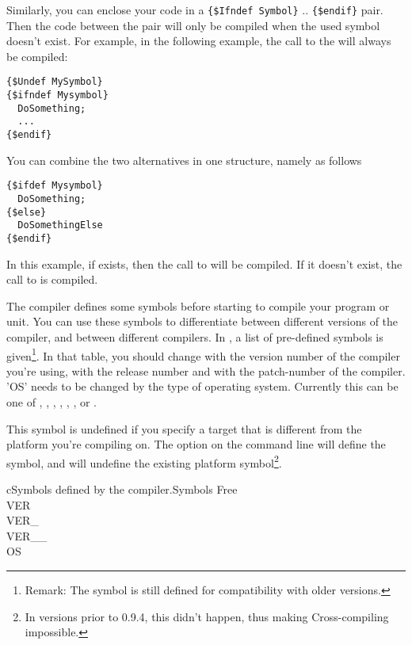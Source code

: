 \documentclass{report}
\begin{document}
Similarly, you can enclose your code in a \verb|{$Ifndef Symbol}| .. \verb|{$endif}|
pair. Then the code between the pair will only be compiled when the used
symbol doesn't exist. For example, in the following example, the call to the
 will always be compiled:
\begin{verbatim}
{$Undef MySymbol}
{$ifndef Mysymbol}
  DoSomething;
  ...
{$endif}
\end{verbatim}

You can combine the two alternatives in one structure, namely as follows
\begin{verbatim}
{$ifdef Mysymbol}
  DoSomething;
{$else}
  DoSomethingElse
{$endif}
\end{verbatim}
In this example, if  exists, then the call to 
will be compiled. If it doesn't exist, the call to  is
compiled.

The \fpc compiler defines some symbols before starting to compile your
program or unit. You can use these symbols to differentiate between
different versions of the compiler, and between different compilers.
In , a list of pre-defined symbols is given\footnote{Remark:
The  symbol is still defined for compatibility with older versions.}. In that table,
you should change  with the version number of the compiler
you're using,  with the release number and 
with the patch-number of the compiler. 'OS' needs to be changed by the type
of operating system. Currently this can be one of , ,
, , , ,  or .

This symbol is undefined if you specify a target that is different from the
platform you're compiling on.
The  option on the command line will define the  symbol,
and will undefine the existing platform symbol\footnote{In versions prior to
0.9.4, this didn't happen, thus making Cross-compiling impossible.}.

\begin{FPCltable}{c}{Symbols defined by the compiler.}{Symbols} \hline
Free \\
VER \\
VER\_ \\
VER\_\_ \\
OS \\ \hline
\end{FPCltable}
\end{document}
